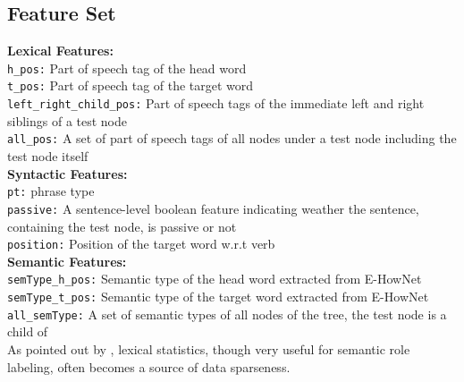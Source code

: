 \documentclass[11pt]{article}
\begin{document}
\subsection{Feature Set}
\textbf{Lexical Features:} \\ 
\verb+h_pos:+ Part of speech tag of the head word\\ 
\verb+t_pos:+ Part of speech tag of the target word\\
\verb+left_right_child_pos:+ Part of speech tags of the immediate left and right siblings of a test node\\
\verb+all_pos:+ A set of part of speech tags of all nodes under a test node including the test node itself\\[0.2cm]
\textbf{Syntactic Features:} \\ 
\verb+pt:+ phrase type\\
\verb+passive:+ A sentence-level boolean feature indicating weather the sentence, containing the test node, is passive or not\\
\verb+position:+ Position of the target word w.r.t verb\\[0.2cm]
\textbf{Semantic Features:}\\
\verb+semType_h_pos:+ Semantic type of the head word extracted from E-HowNet \\ 
\verb+semType_t_pos:+ Semantic type of the target word extracted from E-HowNet\\ 
\verb+all_semType:+ A set of semantic types of all nodes of the tree, the test node is a child of\\[0.2cm]
As pointed out by \cite{Gildea:2002}, lexical statistics, though very useful for semantic role labeling, often becomes a source of data sparseness. %
\end{document}
